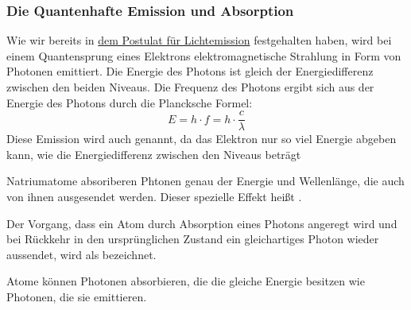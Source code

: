 \documentclass{tuftebook}
\begin{document}
    \subsubsection{Die Quantenhafte Emission und Absorption}
    Wie wir bereits in \hyperref[eq:lichtemission]{dem Postulat für Lichtemission} festgehalten haben, wird bei einem Quantensprung eines Elektrons elektromagnetische Strahlung in Form von Photonen emittiert. Die Energie des Photons ist gleich der Energiedifferenz zwischen den beiden Niveaus. Die Frequenz des Photons ergibt sich aus der Energie des Photons durch die Plancksche Formel:
    \begin{equation}
        E=h\cdot f=h\cdot\frac{c}{\lambda}
        \label{eq:planckf}
    \end{equation}
    Diese Emission wird auch  genannt, da das Elektron nur so viel Energie abgeben kann, wie die Energiedifferenz zwischen den Niveaus beträgt
    \begin{definition}
        \vspace{-1em}
        Natriumatome absoriberen Phtonen genau der Energie und Wellenlänge, die auch von ihnen ausgesendet werden. Dieser spezielle Effekt heißt .
    \end{definition}
    Der Vorgang, dass ein Atom  durch Absorption eines Photons angeregt wird und bei Rückkehr in den ursprünglichen Zustand ein gleichartiges Photon wieder aussendet, wird als  bezeichnet.
    \begin{definition}
        \vspace{-1em}
        Atome können Photonen absorbieren, die die gleiche Energie besitzen wie Photonen, die sie emittieren.
        \label{def:quantenhafteabsorption}
    \end{definition}
\end{document}
